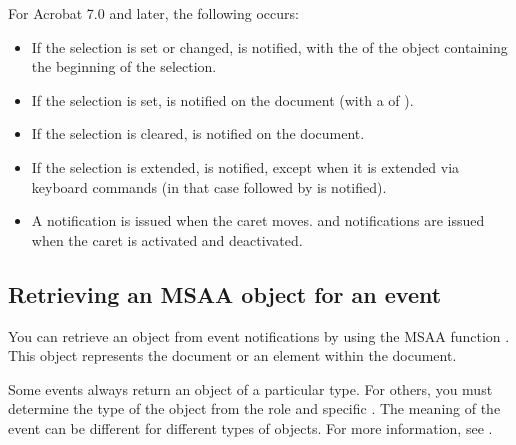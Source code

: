 \documentclass[letterpaper,12pt,english,openany,oneside]{sphinxmanual}
\begin{document}
For Acrobat 7.0 and later, the following occurs:
\begin{itemize}
\item {} 
If the selection is set or changed,  is notified, with the  of the  object containing the beginning of the selection.

\item {} 
If the selection is set,  is notified on the document (with a  of  ).

\item {} 
If the selection is cleared,  is notified on the document.

\item {} 
If the selection is extended,  is notified, except when it is extended via keyboard commands (in that case  followed by  is notified).

\item {} 
A  notification is issued when the caret moves.  and  notifications are issued when the caret is activated and deactivated.

\end{itemize}


\subsection{Retrieving an MSAA object for an event}
\label{\detokenize{index:retrieving-an-msaa-object-for-an-event}}
You can retrieve an  object from event notifications by using the MSAA function  . This object represents the document or an element within the document.

Some events always return an object of a particular type. For others, you must determine the type of the object from the role and specific  . The meaning of the event can be different for different types of objects. For more information, see .
\end{document}
